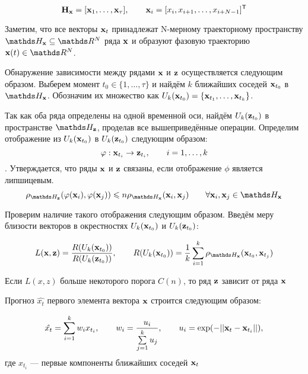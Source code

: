 \documentclass[a4paper]{article}
\begin{document}
\begin{equation*} \label{eq:traj_mat_short}
	\mathbf{H}_{\mathbf{x}} = [\mathbf{x}_1, \ldots, \mathbf{x}_{\tau}], \qquad \mathbf{x}_i = [x_i, x_{i+1}, \ldots, x_{i+N-1}]^{\mathsf{T}} 
\end{equation*}

Заметим, что все векторы $\mathbf{x}_t$ принадлежат N-мерному траекторному пространству $\dH_{\bx} \subseteq \dR^N$ ряда $\mathbf{x}$ и образуют фазовую траекторию $\bx(t) \in \dR^N$.

Обнаружение зависимости между рядами $\mathbf{x}$ и $\mathbf{z}$ осуществляется следующим образом. Выберем момент $t_0 \in \{ 1, \ldots, \tau\}$ и найдём $k$ ближайших соседей $\mathbf{x}_{t_0}$ в $\dH_{\bx}$. Обозначим их множество как $U_k(\mathbf{x}_{t_0}) = \{ \mathbf{x}_{t_1}, \ldots, \mathbf{x}_{t_k} \}$. 

Так как оба ряда определены на одной временной оси, найдём $U_k(\mathbf{z}_{t_0})$ в пространстве $\dH_{\bz}$, проделав все вышеприведённые операции. Определим отображение из $U_k(\mathbf{x}_{t_0})$ в $U_k(\mathbf{z}_{t_0})$ следующим образом: 
$$ \varphi: \mathbf{x}_{t_i} \rightarrow \mathbf{z}_{t_i}, \qquad i = 1, \ldots, k$$.
Утверждается, что ряды $\mathbf{x}$ и $\mathbf{z}$ связаны, если отображение $\phi$ является липшицевым.
$$ \rho_{\dH_{\bz}}(\phi(\bx_i), \phi(\bx_j)) \leq n \rho_{\dH_{\bx}}(\bx_i, \bx_j) \qquad \forall \bx_i, \bx_j \in \dH_{\bx}$$

Проверим наличие такого отображения следующим образом. Введём меру близости векторов в окрестностях $U_k(\mathbf{x}_{t_0})$ и $U_k(\mathbf{z}_{t_0})$:

\begin{equation}
	L(\bx, \bz) = \dfrac{R(U_k(\bx_{t_0}))}{R(U_k(\bz_{t_0}))}, \qquad R(U_k(\bx_{t_0})) = \dfrac{1}{k} \sum\limits_{i=1}^k \rho_{\dH_{\bx}}(\bx_{t_0}, \bx_{t_j})
\end{equation}

Если $L(x, z)$ больше некоторого порога $C(n)$, то ряд $\mathbf{z}$ зависит от ряда $\mathbf{x}$

Прогноз $\hat{x_t}$ первого элемента вектора $\mathbf{x}$ строится следующим образом:

$$\hat{x_t} = \sum\limits_{i=1}^k w_i x_{t_i}, \qquad
w_i = \dfrac{u_i}{\sum\limits_{j=1}^k u_j}, \qquad
u_i = \exp(-||\mathbf{x}_t - \mathbf{x}_{t_i}||), $$
где $x_{t_i}$ --- первые компоненты ближайших соседей $\mathbf{x}_t$

\end{document}
